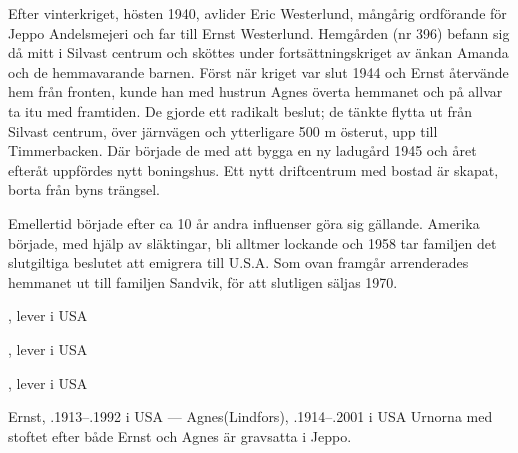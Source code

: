 Efter vinterkriget, hösten 1940, avlider Eric Westerlund, mångårig ordförande för Jeppo Andelsmejeri och far till Ernst Westerlund. Hemgården (nr 396) befann sig då mitt i Silvast centrum och sköttes under fortsättningskriget av änkan Amanda och de hemmavarande barnen.	Först när kriget var slut 1944 och Ernst återvände hem från fronten, kunde han med hustrun Agnes överta hemmanet och på allvar ta itu med framtiden. De gjorde ett radikalt beslut; de tänkte flytta ut från Silvast centrum, över järnvägen och ytterligare 500 m österut, upp till Timmerbacken. Där började de med att bygga en ny ladugård 1945 och året efteråt uppfördes nytt boningshus. Ett nytt driftcentrum med bostad är skapat, borta från byns trängsel.

Emellertid började efter ca 10 år andra influenser göra sig gällande. Amerika började, med hjälp av släktingar, bli alltmer lockande och 1958 tar familjen det slutgiltiga beslutet att emigrera till U.S.A. Som ovan framgår arrenderades hemmanet ut till familjen Sandvik, för att slutligen säljas 1970.
\begin{jhchildren}
  \item {}, lever i USA
  \item {}, lever i USA
  \item {}, lever i USA
\end{jhchildren}
Ernst, .1913--.1992 i USA  ---  Agnes(Lindfors), .1914--.2001 i USA
Urnorna med stoftet efter både Ernst och Agnes är gravsatta i Jeppo.
